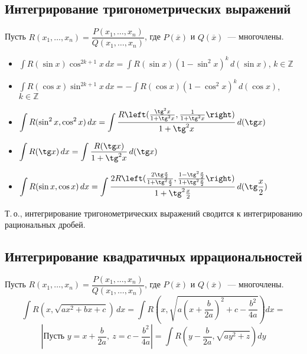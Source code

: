 \subsection{Интегрирование тригонометрических выражений}
Пусть $R(x_1, \ldots, x_n) = \dfrac{P(x_1, \ldots, x_n)}{Q(x_1, \ldots, x_n)}$, где $P(\overline x)$ и $Q(\overline x)$~--- многочлены.
\begin{itemize}
	\item $\displaystyle \int R(\sin x) \cos^{2k+1} x\,dx = \int R(\sin x) (1 - \sin^2 x)^k\,d(\sin x)$, $k \in \mathbb Z$
	
	\item $\displaystyle \int R(\cos x) \sin^{2k+1} x\,dx = -\int R(\cos x) (1 - \cos^2 x)^k\,d(\cos x)$, $k \in \mathbb Z$
	
	\item $\displaystyle \int R(\sin^2 x, \cos^2 x)\,dx = \int \frac
	{R\left( \frac{\tg^2 x}{1 + \tg^2 x}, \frac1{1 + \tg^2 x} \right)}
	{1 + \tg^2 x}\,d(\tg x)$
	
	\item $\displaystyle \int R(\tg x)\,dx = \int \frac{R(\tg x)}{1 + \tg^2 x}\,d(\tg x)$
	
	\item $\displaystyle \int R(\sin x, \cos x)\,dx = \int \frac
	{2R\left( \frac{2\tg \frac{x}2}{1 + \tg^2 \frac{x}2}, \frac{1 - \tg^2 \frac{x}2}{1 + \tg^2 \frac{x}2} \right)}
	{1 + \tg^2 \frac{x}2}\,d(\tg \frac{x}2)$
\end{itemize}

Т.\,о., интегрирование тригонометрических выражений сводится к интегрированию рациональных дробей.

\subsection{Интегрирование квадратичных иррациональностей}
Пусть $R(x_1, \ldots, x_n) = \dfrac{P(x_1, \ldots, x_n)}{Q(x_1, \ldots, x_n)}$, где $P(\overline x)$ и $Q(\overline x)$~--- многочлены.
\begin{equation*}
\int R(x, \sqrt{ax^2 + bx + c})\,dx =
\int R\left( x, \sqrt{a \left( x + \frac{b}{2a} \right)^2 + c - \frac{b^2}{4a}} \right) dx =
\end{equation*}
\begin{equation*}
\left| \text{Пусть } y = x + \frac{b}{2a}, \ z = c - \frac{b^2}{4a} \right| =
\int R\left( y - \frac{b}{2a}, \sqrt{ay^2 + z} \right) dy
\end{equation*}

